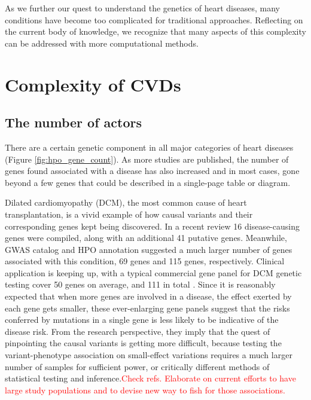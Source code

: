 \documentclass[letter]{bioinfo}
\newcommand{\comment}[1]{\textcolor{red}{#1}}
\begin{document}

As we further our quest to understand the genetics of heart diseases, many conditions have become too complicated for traditional approaches. Reflecting on the current body of knowledge, we recognize that many aspects of this complexity can be addressed with more computational methods.

\section{Complexity of CVDs}  %

\subsection{The number of actors}

% 
There are a certain genetic component in all major categories of heart diseases (Figure \ref{fig:hpo_gene_count}). As more studies are published, the number of genes found associated with a disease has also increased and in most cases, gone beyond a few genes that could be described in a single-page table or diagram.

Dilated cardiomyopathy (DCM), the most common cause of heart transplantation, is a vivid example of how causal variants and their corresponding genes kept being discovered. In a recent review \citep{Burke:2016:Clinical} 16 disease-causing genes were compiled, along with an additional 41 putative genes. Meanwhile, GWAS catalog and HPO annotation suggested a much larger number of genes associated with this condition, 69 genes and 115 genes, respectively. Clinical application is keeping up, with a typical commercial gene panel for DCM genetic testing cover 50 genes on average, and 111 in total \citep{McNally:2017:Dilated}.
Since it is reasonably expected that when more genes are involved in a disease, the effect exerted by each gene gets smaller, these ever-enlarging gene panels suggest that the risks conferred by mutations in a single gene is less likely to be indicative of the disease risk.
From the research perspective, they imply that the quest of pinpointing the causal variants is getting more difficult, because testing the variant-phenotype association on small-effect variations requires a much larger number of samples for sufficient power, or critically different methods of statistical testing and inference.\comment{Check refs. Elaborate on current efforts to have large study populations and to devise new way to fish for those associations.}
\end{document}
